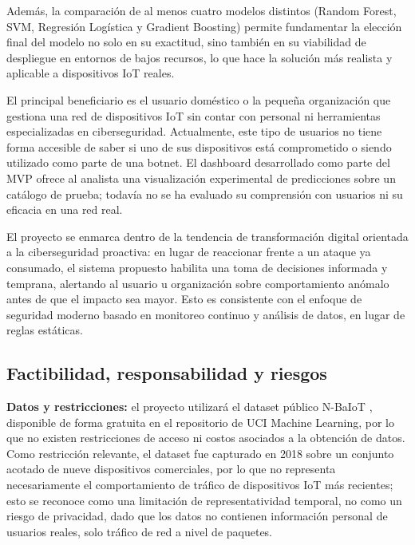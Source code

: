 \documentclass[11pt,a4paper]{article}
\begin{document}
Además, la comparación de al menos cuatro modelos distintos (Random Forest, SVM, Regresión Logística y Gradient Boosting) permite fundamentar la elección final del modelo no solo en su exactitud, sino también en su viabilidad de despliegue en entornos de bajos recursos, lo que hace la solución más realista y aplicable a dispositivos IoT reales.

El principal beneficiario es el usuario doméstico o la pequeña organización que gestiona una red de dispositivos IoT sin contar con personal ni herramientas especializadas en ciberseguridad. Actualmente, este tipo de usuarios no tiene forma accesible de saber si uno de sus dispositivos está comprometido o siendo utilizado como parte de una botnet. El dashboard desarrollado como parte del MVP ofrece al analista una visualización experimental de predicciones sobre un catálogo de prueba; todavía no se ha evaluado su comprensión con usuarios ni su eficacia en una red real.

El proyecto se enmarca dentro de la tendencia de transformación digital orientada a la ciberseguridad proactiva: en lugar de reaccionar frente a un ataque ya consumado, el sistema propuesto habilita una toma de decisiones informada y temprana, alertando al usuario u organización sobre comportamiento anómalo antes de que el impacto sea mayor. Esto es consistente con el enfoque de seguridad moderno basado en monitoreo continuo y análisis de datos, en lugar de reglas estáticas.

\subsection{Factibilidad, responsabilidad y riesgos}
\textbf{Datos y restricciones:} el proyecto utilizará el dataset público N-BaIoT \cite{nbaiot-dataset}, disponible de forma gratuita en el repositorio de UCI Machine Learning, por lo que no existen restricciones de acceso ni costos asociados a la obtención de datos. Como restricción relevante, el dataset fue capturado en 2018 sobre un conjunto acotado de nueve dispositivos comerciales, por lo que no representa necesariamente el comportamiento de tráfico de dispositivos IoT más recientes; esto se reconoce como una limitación de representatividad temporal, no como un riesgo de privacidad, dado que los datos no contienen información personal de usuarios reales, solo tráfico de red a nivel de paquetes.
\end{document}
